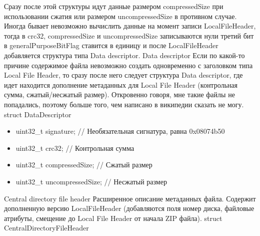 Сразу после этой структуры идут данные размером compressedSize при использовании сжатия или размером uncompressedSize в противном случае.
Иногда бывает невозможно вычислить данные на момент записи LocalFileHeader, тогда в crc32, compressedSize и uncompressedSize записываются нули третий бит в generalPurposeBitFlag ставится в единицу и после LocalFileHeader добавляется структура типа Data descriptor.
Data descriptor
Если по какой-то причине содержимое файла невозможно создать одновременно с заголовком типа Local File Header, то сразу после него следует структура Data descriptor, где идет находится дополнение метаданных для Local File Header (контрольная сумма, сжатый/несжатый размер). Откровенно говоря, мне такие файлы не попадались, поэтому больше того, чем написано в википедии сказать не могу.
struct DataDescriptor
\begin{itemize}
\item    uint32_t signature;		// Необязательная сигнатура, равна 0x08074b50
\item    uint32_t crc32;			// Контрольная сумма
\item    uint32_t compressedSize;	// Сжатый размер
\item    uint32_t uncompressedSize;	 // Несжатый размер
\end{itemize}
Central directory file header
Расширенное описание метаданных файла. Содержит дополненную версию LocalFileHeader (добавляются поля номер диска, файловые атрибуты, смещение до Local File Header от начала ZIP файла).
struct CentralDirectoryFileHeader
